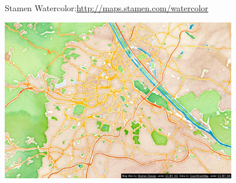 \documentclass[handout]{beamer}
\begin{document}
\begin{frame}{Stamen Watercolor:\hfill\href{http://maps.stamen.com/watercolor/}{http://maps.stamen.com/watercolor}}
\begin{center}
\includegraphics[height=7cm]{style-stamen.png}
\end{center}
\end{frame}
\hypersetup{urlcolor=blue}

\end{document}
